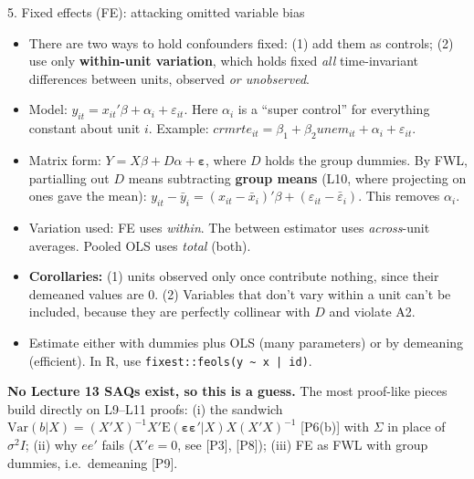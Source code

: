 \documentclass[10pt]{article}
\newcommand{\E}{\mathrm{E}}
\newcommand{\Var}{\mathrm{Var}}
\newcommand{\veps}{\bm{\varepsilon}}
\begin{document}
{\begin{topic}{5. Fixed effects (FE): attacking omitted variable bias}
\begin{itemize}
\item There are two ways to hold confounders fixed: (1) add them as controls; (2) use only \textbf{within-unit variation}, which holds fixed \emph{all} time-invariant differences between units, observed \emph{or unobserved}.
\item Model: $y_{it}=x_{it}'\beta+\alpha_i+\varepsilon_{it}$. Here $\alpha_i$ is a ``super control'' for everything constant about unit $i$. Example: $crmrte_{it}=\beta_1+\beta_2unem_{it}+\alpha_i+\varepsilon_{it}$.
\item Matrix form: $Y=X\beta+D\alpha+\veps$, where $D$ holds the group dummies. By FWL, partialling out $D$ means subtracting \textbf{group means} (L10, where projecting on ones gave the mean):
$y_{it}-\bar y_i=(x_{it}-\bar x_i)'\beta+(\varepsilon_{it}-\bar\varepsilon_i)$. This removes $\alpha_i$.
\item Variation used: FE uses \emph{within}. The between estimator uses \emph{across}-unit averages. Pooled OLS uses \emph{total} (both).
\item \textbf{Corollaries:} (1) units observed only once contribute nothing, since their demeaned values are $0$. (2) Variables that don't vary within a unit can't be included, because they are perfectly collinear with $D$ and violate A2.
\item Estimate either with dummies plus OLS (many parameters) or by demeaning (efficient). In R, use \texttt{fixest::feols(y \textasciitilde{} x | id)}.
\end{itemize}
\end{topic}

\begin{exam}
\textbf{No Lecture 13 SAQs exist, so this is a guess.} The most proof-like pieces build directly on L9--L11 proofs: (i) the sandwich $\Var(b|X)=(X'X)^{-1}X'\E(\veps\veps'|X)X(X'X)^{-1}$ [P6(b)] with $\Sigma$ in place of $\sigma^2I$; (ii) why $ee'$ fails ($X'e=0$, see [P3], [P8]); (iii) FE as FWL with group dummies, i.e.\ demeaning [P9].
\end{exam}

}
\end{document}

